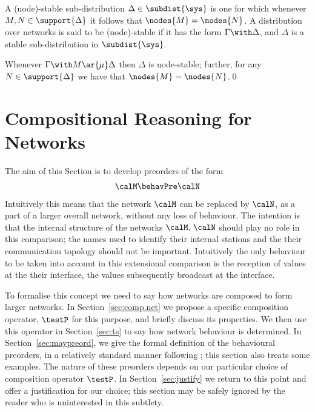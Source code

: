 \documentclass{LMCS}
\begin{document}
\begin{defi}
A (node)-stable sub-distribution $\Delta \in 
\subdist{\sys}$ is one for which 
whenever $M, N \in \support{\Delta}$ 
it follows that $\nodes{M} = \nodes{N}$.
A distribution over networks is said to 
be (node)-stable if it has the form 
$\Gamma \with \Delta$, and $\Delta$ 
is a stable sub-distribution in 
$\subdist{\sys}$.
\end{defi}
\begin{cor}
\label{cor:stable.dist}

Whenever $\Gamma\with M \ar{\mu} \Delta$ 
then $\Delta$ is node-stable; further, 
for any $N \in \support{\Delta}$ 
we have that $\nodes{M} = \nodes{N}$.\qed
\end{cor}


\section{Compositional Reasoning for Networks}
\label{sec:compositional}


The aim of this Section is to  
develop preorders of the form
\begin{align}\label{eq:behaviour}
  \calM \behavPre \calN
\end{align}
Intuitively this means that the network $\calM$ can be replaced by
$\calN$, as a part of a larger overall network, without any loss of
behaviour. The intention is that the internal structure of the
  networks $\calM,\, \calN$ should play no role in this comparison; the
  names used to identify their internal stations and the their
  communication topology should not be important. Intuitively the only
  behaviour to be taken into account in this extensional comparison is
  the reception of values at the their interface, the values
  subsequently broadcast at the interface.  

To formalise this concept 
we need to  say how networks are composed to form larger networks.
In  
Section~\ref{sec:comp.net} we propose a specific composition  operator, $\testP$
for this purpose, and briefly discuss  its properties.  We then use
this operator in Section~\ref{sec:ts} to say how network behaviour is determined. 
In Section~\ref{sec:maypreord}, we  give 
the formal definition of the behavioural preorders, in a relatively standard manner following 
\cite{dnh}; this section also treats some  examples.
The nature of these preorders depends on our particular choice of
composition  operator $\testP$. In Section~\ref{sec:justify} we return
to this point and offer a justification for our choice; this section may
be safely ignored by the reader who is uninterested in this subtlety.
\end{document}
